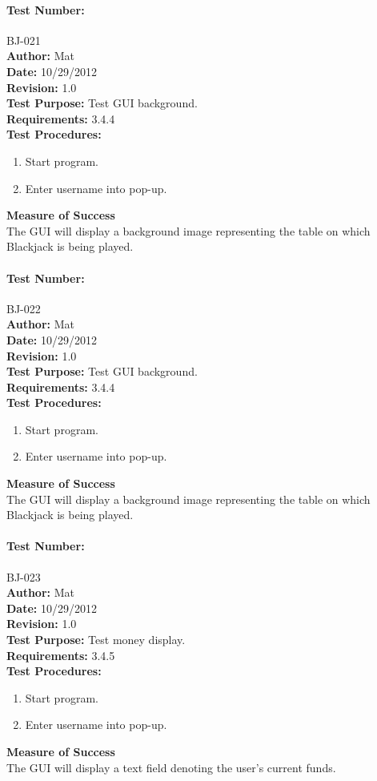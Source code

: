 \documentclass{article}
\begin{document}
\paragraph{Test Number:} BJ-021\\
\textbf{Author:} Mat\\
\textbf{Date:} 10/29/2012\\
\textbf{Revision:} 1.0\\
\textbf{Test Purpose:} Test GUI background.\\
\textbf{Requirements:} 3.4.4 \\
\textbf{Test Procedures:} 
\begin{enumerate}
\item Start program.
\item Enter username into pop-up.
\end{enumerate}
\textbf{Measure of Success}\\The GUI will display a background image representing the table on which Blackjack is being played.
\paragraph{Test Number:} BJ-022\\
\textbf{Author:} Mat\\
\textbf{Date:} 10/29/2012\\
\textbf{Revision:} 1.0\\
\textbf{Test Purpose:} Test GUI background.\\
\textbf{Requirements:} 3.4.4 \\
\textbf{Test Procedures:} 
\begin{enumerate}
\item Start program.
\item Enter username into pop-up.
\end{enumerate}
\textbf{Measure of Success}\\The GUI will display a background image representing the table on which Blackjack is being played.
\paragraph{Test Number:} BJ-023\\
\textbf{Author:} Mat\\
\textbf{Date:} 10/29/2012\\
\textbf{Revision:} 1.0\\
\textbf{Test Purpose:} Test money display.\\
\textbf{Requirements:} 3.4.5 \\
\textbf{Test Procedures:} 
\begin{enumerate}
\item Start program.
\item Enter username into pop-up.
\end{enumerate}
\textbf{Measure of Success}\\The GUI will display a text field denoting the user's current funds.
\end{document}
